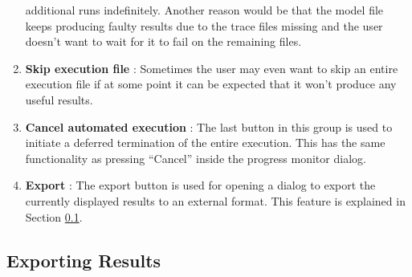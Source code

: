\begin{enumerate}
additional runs indefinitely. Another reason would be that the model file keeps producing faulty results
due to the trace files missing and the user doesn't want to wait for it to fail on the remaining files.
 \item \textbf{Skip execution file} : Sometimes the user may even want to skip an entire execution
file if at some point it can be expected that it won't produce any useful results.
 \item \textbf{Cancel automated execution} : The last button in this group is used to initiate a deferred
termination of the entire execution. This has the same functionality as pressing ``Cancel'' inside the 
progress monitor dialog.
 \item \textbf{Export} : The export button is used for opening a dialog to export the currently displayed
results to an external format. This feature is explained in Section \ref{section:AutoExportResults}.
\end{enumerate}

\subsection{Exporting Results}
\label{section:AutoExportResults}
